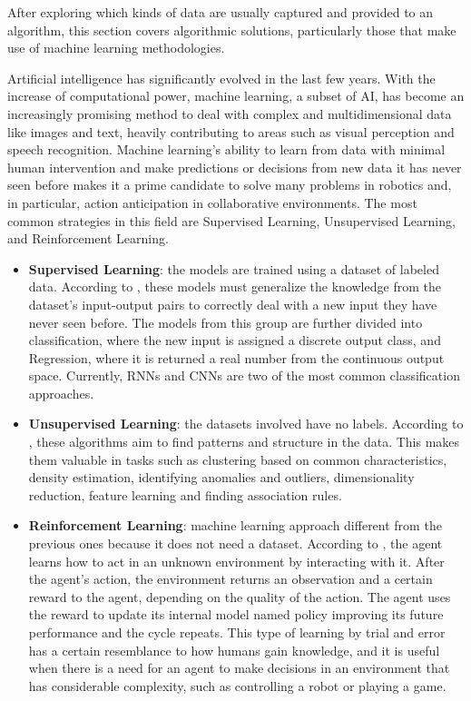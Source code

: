 \documentclass[conference]{IEEEtran}
\begin{document}
After exploring which kinds of data are usually captured and provided to an algorithm, this section covers algorithmic solutions, particularly those that make use of machine learning methodologies.


Artificial intelligence has significantly evolved in the last few years. With the increase of computational power, machine learning, a subset of AI, has become an increasingly promising method to deal with complex and multidimensional data like images and text, heavily contributing to areas such as visual perception and speech recognition. Machine learning’s ability to learn from data with minimal human intervention and make predictions or decisions from new data it has never seen before makes it a prime candidate to solve many problems in robotics and, in particular, action anticipation in collaborative environments. The most common strategies in this field are Supervised Learning, Unsupervised Learning, and Reinforcement Learning.

\begin{itemize}
\item \textbf{Supervised Learning}: the models are trained using a dataset of labeled data. According to \textcite{Sarker2021}, these models must generalize the knowledge from the dataset’s input-output pairs to correctly deal with a new input they have never seen before. The models from this group are further divided into classification, where the new input is assigned a discrete output class, and Regression, where it is returned a real number from the continuous output space. Currently, RNNs and CNNs are two of the most common classification approaches.

\item \textbf{Unsupervised Learning}: the datasets involved have no labels. According to \textcite{Sarker2021}, these algorithms aim to find patterns and structure in the data. This makes them valuable in tasks such as clustering based on common characteristics, density estimation, identifying anomalies and outliers, dimensionality reduction, feature learning and finding association rules.

\item \textbf{Reinforcement Learning}: machine learning approach different from the previous ones because it does not need a dataset. According to \textcite{Alom2019}, the agent learns how to act in an unknown environment by interacting with it. After the agent’s action, the environment returns an observation and a certain reward to the agent, depending on the quality of the action. The agent uses the reward to update its internal model named policy improving its future performance and the cycle repeats. This type of learning by trial and error has a certain resemblance to how humans gain knowledge, and it is useful when there is a need for an agent to make decisions in an environment that has considerable complexity, such as controlling a robot or playing a game.
\end{itemize}
\end{document}
